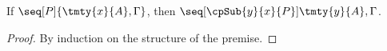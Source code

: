 \begin{lemma}\label{lem:cp-preservation-subst}
  If $\seq[P]{\tmty{x}{A}, \Gamma}$, then $\seq[\cpSub{y}{x}{P}]{\tmty{y}{A},
    \Gamma}$.
\end{lemma}
\begin{proof}
  By induction on the structure of the premise.
\end{proof}
